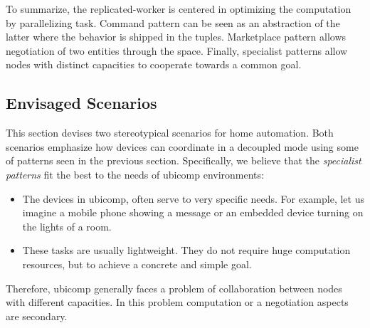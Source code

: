 To summarize, the replicated-worker is centered in optimizing the computation by parallelizing task.
Command pattern can be seen as an abstraction of the latter where the behavior is shipped in the tuples.
Marketplace pattern allows negotiation of two entities through the space.
Finally, specialist patterns allow nodes with distinct capacities to cooperate towards a common goal.





\subsection{Envisaged Scenarios}
\label{sec:envisaged_scenarios}

This section devises two stereotypical scenarios for home automation.
Both scenarios emphasize how devices can coordinate in a decoupled mode using some of patterns seen in the previous section. %
Specifically, we believe that the \emph{specialist patterns} fit the best to the needs of \ac{ubicomp} environments:
\begin{itemize}
  \item The devices in \ac{ubicomp}, often serve to very specific needs.
        For example, let us imagine a mobile phone showing a message or an embedded device turning on the lights of a room.
  \item These tasks are usually lightweight.
        They do not require huge computation resources, but to achieve a concrete and simple goal.
\end{itemize}
Therefore, \ac{ubicomp} generally faces a problem of collaboration between nodes with different capacities.
In this problem computation or a negotiation aspects are secondary. %




